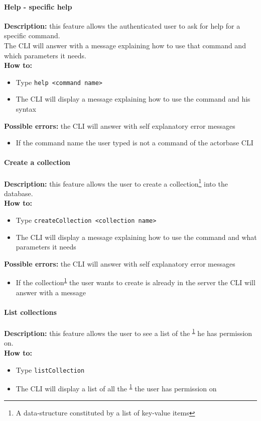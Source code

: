 \documentclass{scalatekids-article}
\begin{document}
\paragraph{Help - specific help}
\label{sec:specifichelp}
\textbf{Description:} this feature allows the authenticated user to ask for help for
a specific command.\\
The CLI will answer with a message explaining how to use that command and
which parameters it needs.\\
\textbf{How to:}
\begin{itemize}
\item Type \texttt{help <command name>}
\item The CLI will display a message explaining how to use the command and his syntax
\end{itemize}
\textbf{Possible errors:} the CLI will answer with self explanatory error messages
\begin{itemize}
\item If the command name the user typed is not a command of the actorbase CLI
\end{itemize}

\paragraph{Create a collection}
\label{sec:createcollection}
\textbf{Description:} this feature allows the user to create a
collection\footnote{A data-structure constituted by a list of key-value items\label{coll}} into the database.\\
\textbf{How to:}
\begin{itemize}
\item Type \texttt{createCollection <collection name>}
\item The CLI will display a message explaining how to use the command and what parameters it needs
\end{itemize}
\textbf{Possible errors:} the CLI will answer with self explanatory error messages
\begin{itemize}
\item If the collection\textsuperscript{\ref{coll}} the user wants to create is already in the server the CLI will answer with a message
\end{itemize}

\paragraph{List collections}
\label{sec:listcollection}
\textbf{Description:} this feature allows the user to see a list of
the \textsuperscript{\ref{coll}} he has permission on.\\
\textbf{How to:}
\begin{itemize}
\item Type \texttt{listCollection}
\item The CLI will display a list of all the \textsuperscript{\ref{coll}} the user has
  permission on
\end{itemize}
\end{document}
